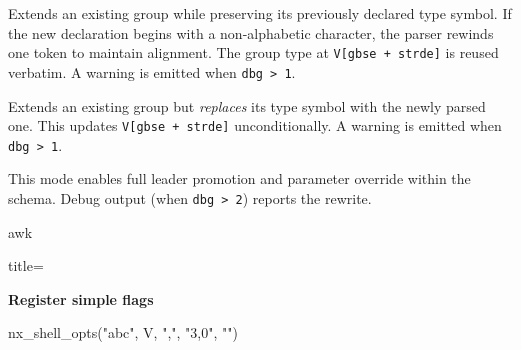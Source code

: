 \begin{NxLightBox}[title={\texttt{1} --- Preserve Type}]
Extends an existing group while preserving its previously declared
type symbol. If the new declaration begins with a non-alphabetic
character, the parser rewinds one token to maintain alignment.
The group type at \texttt{V[gbse + strde]} is reused verbatim.
A warning is emitted when \texttt{dbg > 1}.
\end{NxLightBox}

\begin{NxLightBox}[title={\texttt{2} --- Replace Type}]
Extends an existing group but \emph{replaces} its type symbol with the
newly parsed one. This updates \texttt{V[gbse + strde]} unconditionally.
A warning is emitted when \texttt{dbg > 1}. \\
\end{NxLightBox}

\begin{NxLightBox}[title={\texttt{3} --- Rebuild / Leader Promotion}]
	\begin{NxLightList}
	\end{NxLightList}
	\begin{NxLightP}
	This mode enables full leader promotion and parameter override within the
	schema. Debug output (when \texttt{dbg > 2}) reports the rewrite.
	\end{NxLightP}
\end{NxLightBox}


\begin{NxCodeBox}{awk}{title={\textbf{Register simple flags}%
	\begin{NxDarkList}
	\end{NxDarkList}
}}
nx_shell_opts("abc", V, ",", "3,0", "")
\end{NxCodeBox}


